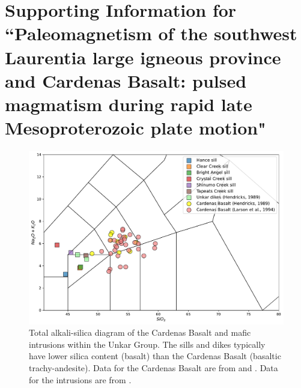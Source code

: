 \chapter[Supporting Information for ``Paleomagnetism of the southwest Laurentia large igneous province and Cardenas Basalt: pulsed magmatism during rapid late Mesoproterozoic plate motion"][Supporting Information--SWLLIP]{Supporting Information for ``Paleomagnetism of the southwest Laurentia large igneous province and Cardenas Basalt: pulsed magmatism during rapid late Mesoproterozoic plate motion"}

\begin{figure}
\centering
\includegraphics[width=\textwidth]{figure/Zhang2024b/Cardenas_Unkar_geochem_major.pdf}
\caption[Major element geochemical data of the Cardenas Basalt and diabase intrusions in the Unkar Group]{Total alkali-silica diagram of the Cardenas Basalt and mafic intrusions within the Unkar Group. The sills and dikes typically have lower silica content (basalt) than the Cardenas Basalt (basaltic trachy-andesite). Data for the Cardenas Basalt are from \cite{Hendricks1989a} and \cite{Larson1994a}. Data for the intrusions are from \cite{Hendricks1989a}.}
\label{fig:geochem_major}
\end{figure}

